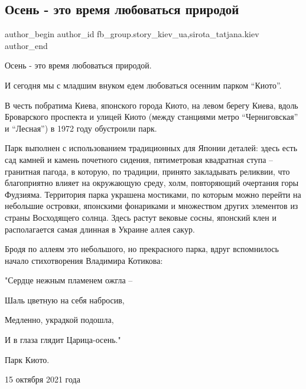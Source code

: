 
 
 
 
 
 
\subsection{Осень - это время  любоваться природой}
\label{sec:16_10_2021.fb.fb_group.story_kiev_ua.2.osenj_park_kioto}
 
\ifcmt
 author_begin
   author_id fb_group.story_kiev_ua,sirota_tatjana.kiev
 author_end
\fi

\begin{multicols}{2} %

Осень - это время любоваться природой.

И сегодня мы с младшим внуком едем любоваться осенним парком \enquote{Киото}.

В честь побратима Киева, японского города Киото, на левом берегу Киева, вдоль
Броварского проспекта и улицей Киото (между станциями метро \enquote{Черниговская} и
\enquote{Лесная}) в 1972  году обустроили парк.

Парк выполнен с использованием традиционных для Японии деталей: здесь есть сад
камней и камень почетного сидения, пятиметровая квадратная ступа – гранитная
пагода, в которую, по традиции, принято закладывать реликвии, что благоприятно
влияет на окружающую среду, холм, повторяющий очертания горы Фудзияма.
Территория парка украшена мостиками, по которым можно перейти на небольшие
островки, японскими фонариками и множеством других элементов из страны
Восходящего солнца. Здесь растут вековые сосны, японский клен и располагается
самая длинная в Украине аллея сакур.

Бродя по аллеям это небольшого, но прекрасного парка, вдруг вспомнилось начало
стихотворения Владимира Котикова:

"Сердце нежным пламенем ожгла –

Шаль цветную на себя набросив,

Медленно, украдкой подошла,

И в глаза глядит Царица-осень."

Парк Киото.

15 октября 2021 года 

\setlength{\parindent}{0pt}
\end{multicols} %


\begin{multicols}{2} %
\setlength{\parindent}{0pt}

\end{multicols} %
